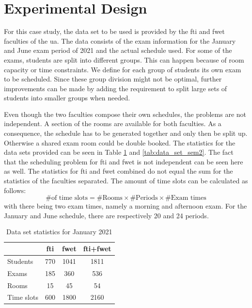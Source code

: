 \section{Experimental Design}\label{sec:experiment}

For this case study, the data set to be used is provided by the \acrshort{fti} and \acrshort{fwet} faculties of the \acrfull{ua}. The data consists of the exam information for the January and June exam period of 2021 and the actual schedule used. For some of the exams, students are split into different groups. This can happen because of room capacity or time constraints. We define for each group of students its own exam to be scheduled. Since these group division might not be optimal, further improvements can be made by adding the requirement to split large sets of students into smaller groups when needed.

Even though the two faculties compose their own schedules, the problems are not independent. A section of the rooms are available for both faculties. As a consequence, the schedule has to be generated together and only then be split up. Otherwise a shared exam room could be double booked. The statistics for the data sets provided can be seen in Table \ref{tab:data_set_sem1} and \ref{tab:data_set_sem2}. The fact that the scheduling problem for \acrshort{fti} and \acrshort{fwet} is not independent can be seen here as well. The statistics for \acrshort{fti} and \acrshort{fwet} combined do not equal the sum for the statistics of the faculties separated. The amount of time slots can be calculated as follows:
\begin{equation}
    \text{\# of time slots} = \text{\# Rooms} \times \text{\# Periods} \times \text{\# Exam times}  
\end{equation}
with there being two exam times, namely a morning and afternoon exam. For the January and June schedule, there are respectively 20 and 24 periods.
\begin{table}[H]
	\caption{Data set statistics for January 2021}
	\label{tab:data_set_sem1}
	\centering
	\begin{tabular}{l c c c }
		\hline
		& \textbf{\acrshort{fti}} & \textbf{\acrshort{fwet}} & \textbf{\acrshort{fti}+\acrshort{fwet}} \\ \hline
		Students & 770 & 1041 & 1811 \\
		Exams & 185 & 360 & 536 \\
	    Rooms & 15 & 45 & 54 \\
        Time slots & 600 & 1800 & 2160 \\ \hline
	\end{tabular}
\end{table}

